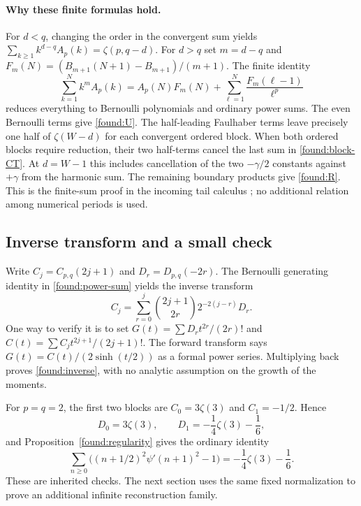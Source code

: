 \documentclass[11pt]{article}
\theoremstyle{definition}
\theoremstyle{remark}
\numberwithin{equation}{section}
\begin{document}
\paragraph{Why these finite formulas hold.}
For $d<q$, changing the order in the convergent sum yields
$\sum_{k\ge1}k^{d-q}A_p(k)=\zeta(p,q-d)$.
For $d>q$ set $m=d-q$ and
$F_m(N)=(B_{m+1}(N+1)-B_{m+1})/(m+1)$. The finite identity
\[
 \sum_{k=1}^N k^mA_p(k)
 =A_p(N)F_m(N)+
                  \sum_{\ell=1}^N\frac{F_m(\ell-1)}{\ell^p}
\]
reduces everything to Bernoulli polynomials and ordinary power sums.
The even Bernoulli terms give \eqref{found:U}. The half-leading Faulhaber terms leave precisely
one half of $\zeta(W-d)$ for each convergent ordered block. When
both ordered blocks require reduction, their two half-terms cancel
the last sum in \eqref{found:block-CT}. At $d=W-1$ this includes cancellation of
the two $-\gamma/2$ constants against $+\gamma$ from the harmonic
sum. The remaining boundary products give \eqref{found:R}.
This is the finite-sum proof in the incoming tail calculus
\cite{Canonical,Bernoulli}; no additional relation among numerical
periods is used.

\subsection{Inverse transform and a small check}

Write $C_j=C_{p,q}(2j+1)$ and $D_r=D_{p,q}(-2r)$.
The Bernoulli generating identity in \eqref{found:power-sum} yields
the inverse transform
\begin{equation}\label{found:inverse}
 C_j=\sum_{r=0}^j\binom{2j+1}{2r}2^{-2(j-r)}D_r.
\end{equation}
One way to verify it is to set
$G(t)=\sum D_rt^{2r}/(2r)!$ and
$C(t)=\sum C_jt^{2j+1}/(2j+1)!$. The forward transform says
$G(t)=C(t)/(2\sinh(t/2))$ as a formal power series. Multiplying
back proves \eqref{found:inverse}, with no analytic assumption on
the growth of the moments.

For $p=q=2$, the first two blocks are $C_0=3\zeta(3)$ and
$C_1=-1/2$. Hence
\[
 D_0=3\zeta(3),\qquad
 D_1=-\frac14\zeta(3)-\frac16,
\]
and Proposition~\ref{found:regularity} gives the ordinary identity
\[
 \sum_{n\ge0}\bigl((n+1/2)^2\psi'(n+1)^2-1\bigr)
 =-\frac14\zeta(3)-\frac16.
\]
These are inherited checks. The next section uses the same fixed
normalization to prove an additional infinite reconstruction family.

\end{document}
